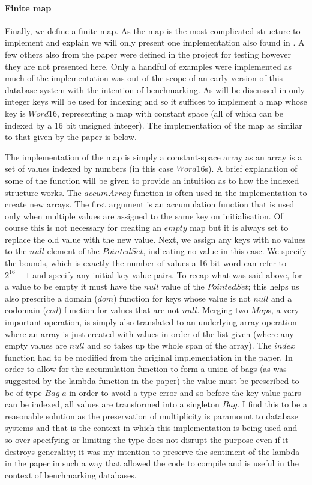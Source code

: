 \paragraph{Finite map} Finally, we define a finite map. As the map is the most
complicated structure to implement and explain we will only present one
implementation also found in \relalg{}. A few others also from the paper were
defined in the project for testing however they are not presented here. Only a
handful of examples were implemented as much of the implementation was out of
the scope of an early version of this database system with the intention
of benchmarking. As will be discussed in  only
integer keys will be used for indexing and so it suffices to implement a map
whose key is $Word16$, representing a map with constant space (all of which can
be indexed by a 16 bit unsigned integer). The implementation of the map as
similar to that given by the paper is below.



\noindent
The implementation of the map is simply a constant-space array as an array is a
set of values indexed by numbers (in this case $Word16$s). A brief
explanation of some of the function will be given to provide an intuition as to how
the indexed structure works. The $accumArray$ function is often used in the
implementation to create new arrays. The first argument is an accumulation
function that is used only when multiple values are assigned to the same key on
initialisation. Of course this is not necessary for creating an $empty$ map but
it is always set to replace the old value with the new value. Next, we assign any
keys with no values to the $null$ element of the $PointedSet$, indicating no
value in this case. We specify the bounds, which is exactly the number of values
a 16 bit word can refer to $2^{16} - 1$ and specify any initial key value pairs.
To recap what was said above, for a value to be empty it must have the $null$
value of the $PointedSet$; this helps us also prescribe a domain ($dom$)
function for keys whose value is not $null$ and a codomain ($cod$) function for
values that are not $null$. Merging two $Map$s, a very important operation,
is simply also translated to an underlying array operation where an array is
just created with values in order of the list given (where any empty values are
$null$ and so takes up the whole span of the array). The $index$ function had to
be modified from the original implementation in the paper. In order to allow for
the accumulation function to form a union of bags (as was suggested by the
lambda function in the paper) the value must be prescribed to be of type
$Bag\;a$ in order to avoid a type error and so before the key-value pairs can be indexed, all values are
transformed into a singleton $Bag$. I find this to be a reasonable solution as the
preservation of multiplicity is paramount to database systems and that is the
context in which this implementation is being used and so over specifying or
limiting the type does not disrupt the purpose even if it destroys generality; it
was my intention to preserve the sentiment of the lambda in the paper in such a
way that allowed the code to compile and is useful in the context of
benchmarking databases.
